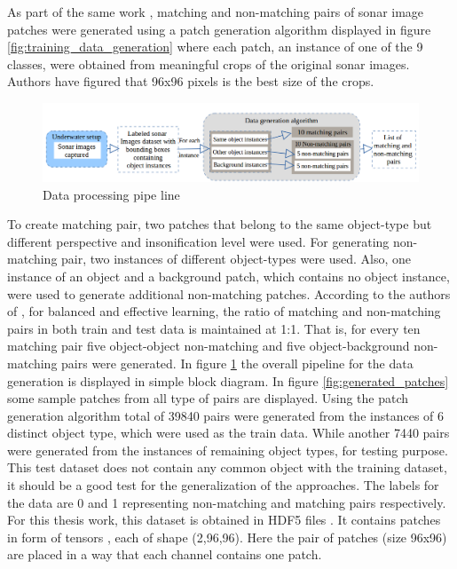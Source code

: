 As part of the same work \cite{stateoftheart}, matching and non-matching pairs 
of sonar image patches were generated using a patch generation algorithm displayed in figure \ref{fig:training_data_generation} where each patch, an instance of one of the 9 classes, were obtained from meaningful crops of the original 
sonar images. Authors have figured that 96x96 pixels is the best size of the crops.

\begin{figure}[ht]
\centering
\includegraphics[width= 14cm]{images/densenet/data_pipeline2}
\caption{Data processing pipe line}
\label{fig:data_pipeline}
\end{figure}

To create matching pair, two patches that belong to the same object-type but different perspective and insonification level were used. For generating non-matching pair, two instances of different 
object-types were used. Also, one instance of an object and a background patch, which contains no object instance, were used to generate additional non-matching patches. According to the authors of \cite{stateoftheart}, 
for balanced and effective learning, the ratio of matching and non-matching pairs in both train and test data is maintained at 1:1. That is, for every ten matching pair five object-object non-matching 
and five object-background non-matching pairs were generated. In figure \ref{fig:data_pipeline} the overall pipeline for the data generation is displayed in simple block diagram.
In figure \ref{fig:generated_patches} some sample patches from all type of pairs are displayed. Using the patch generation algorithm total of 
39840 pairs were generated from the instances of 6 distinct object type, which were used as the train data.
While another 7440 pairs were generated from the instances of remaining object types, for testing purpose. This test dataset does not contain any common object with the training dataset,
it should be a good test for the generalization of the approaches. The labels for the data are 0 and 1 representing non-matching and matching pairs respectively. 
For this thesis work, this dataset is obtained in HDF5 files \cite{hdf5}. It contains patches in form of tensors \cite{tensors}, each of shape (2,96,96). Here the pair of patches (size 96x96) are placed in a way that each channel
contains one patch. %

